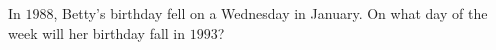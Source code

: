 In $1988$, Betty's birthday fell on a Wednesday in January. On what day of the week will her birthday fall in $1993$?
